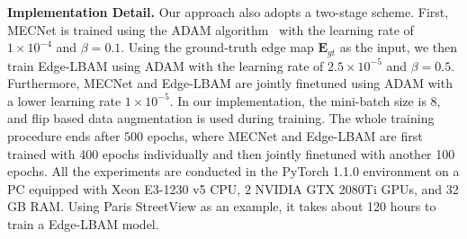 \documentclass[10pt,journal,compsoc]{IEEEtran}
\begin{document}
{\textbf{Implementation Detail.}} Our approach also adopts a two-stage scheme.
%
First, MECNet is trained using the ADAM algorithm~\cite{AdamOptim} with the learning rate of $1 \times 10^{-4}$ and $\beta=0.1$.
%
Using the ground-truth edge map $\mathbf{E}_{gt}$ as the input, we then train Edge-LBAM using ADAM with the learning rate of $2.5 \times 10^{-5}$ and $\beta=0.5$.
%
Furthermore, MECNet and Edge-LBAM are jointly finetuned using ADAM with a lower learning rate $1 \times 10^{-5}$.
%
%
In our implementation, the mini-batch size is $8$, and flip based data augmentation is used during training.
%
The whole training procedure ends after $500$ epochs, where MECNet and Edge-LBAM are first trained with 400 epochs individually and then jointly finetuned with another 100 epochs.
%
All the experiments are conducted in the PyTorch 1.1.0 environment on a PC equipped with {Xeon E3-1230 v5 CPU}, $2$ NVIDIA GTX 2080Ti GPUs, and {32 GB RAM}.
%
Using Paris StreetView as an example, it takes about {120 hours} to train a Edge-LBAM model.
\end{document}
